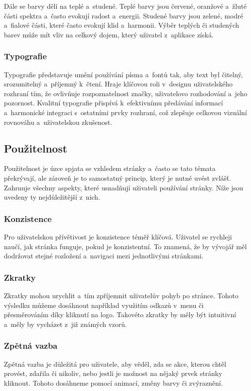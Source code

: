 Dále se barvy dělí na teplé a~studené. Teplé barvy jsou červené, oranžové a~žluté části spektra a~často evokují radost a~energii. Studené barvy jsou zelené, modré a~fialové části, které často evokují klid a~harmonii. Výběr teplých či studených barev může mít vliv na celkový dojem, který uživatel z~aplikace získá. \cite{color_theory_design} 

\subsubsection{Typografie}
Typografie představuje umění používání písma a~fontů tak, aby text byl čitelný, srozumitelný a~příjemný k~čtení. Hraje klíčovou roli v~designu uživatelského rozhraní tím, že ovlivňuje rozpoznatelnost značky, uživatelovo rozhodování a~jeho pozornost. Kvalitní typografie přispívá k~efektivnímu předávání informací a~harmonické integraci s~ostatními prvky rozhraní, což zlepšuje celkovou vizuální rovnováhu a~uživatelskou zkušenost. \cite{typography}

\subsection{Použitelnost}
Použitelnost je úzce spjata se vzhledem stránky a~často se tato témata překrývají, ale zároveň je to samostatný princip, který je nutné uvést zvlášť. Zahrnuje všechny aspekty, které usnadňují uživateli používání stránky. Níže jsou uvedeny ty nejdůležitější z~nich. \cite{principles_of_ui_design}

\subsubsection*{Konzistence}
Pro uživatelskou přívětivost je konzistence téměř klíčová. Uživatel se rychleji naučí, jak stránka funguje, pokud je konzistentní. To znamená, že by vývojář měl dodržovat stejné rozložení a~navigaci mezi jednotlivými stránkami.

\subsubsection*{Zkratky}
Zkratky mohou urychlit a~tím zpříjemnit uživatelův pohyb po stránce. Tohoto výsledku můžeme dosáhnout například využitím odkazů v~menu či přesměrováním díky kliknutí na logo. Takovéto zkratky by měly být intuitivní a~měly by vycházet z~již známých vzorů.

\subsubsection*{Zpětná vazba}
Zpětná vazba je důležitá pro uživatele, aby věděl, zda se akce, kterou chtěl provést, zdařila či nikoliv, nebo jestli je možnost na nějaký prvek stránky kliknout. Tohoto dosáhneme pomocí animací, změny barvy či zvýraznění.

